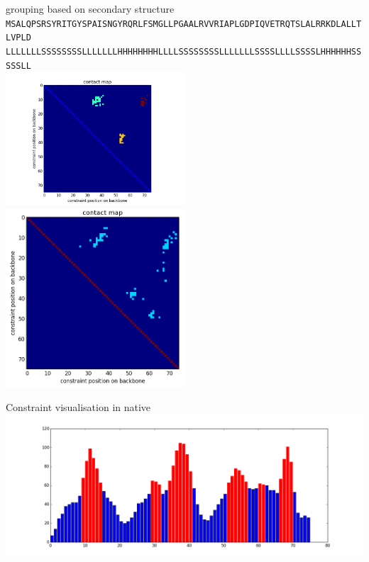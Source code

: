 \documentclass{beamer}
\begin{document}
\begin{frame}{grouping based on secondary structure}
    \centering
    \tiny
    \texttt{
MSALQPSRSYRITGYSPAISNGYRQRLFSMGLLPGAALRVVRIAPLGDPIQVETRQTSLALRRKDLALLTLVPLD\\
LLLLLLLSSSSSSSSLLLLLLLHHHHHHHHLLLLSSSSSSSSLLLLLLLSSSSLLLLSSSSLHHHHHHSSSSSLL\\}
    \normalsize
    \vspace{.5cm}
    \includegraphics[trim = 25mm 0mm 25mm 10mm, clip, width=0.5\textwidth]{img/contactMapLargeGroups}
    \includegraphics[width=0.5\textwidth]{img/contactMapNatives}
\end{frame}

\begin{frame}{Constraint visualisation in native}
    \centering
    \includegraphics[width=\textwidth]{img/occurrenceBar}
\end{frame}
\end{document}
